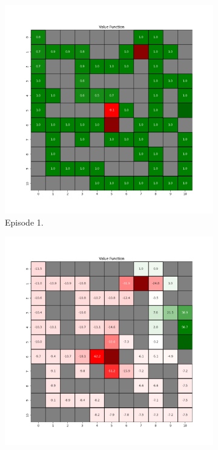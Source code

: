 \documentclass{assignment}
\begin{document}
\begin{figure}[H]
    \begin{subfigure}{0.3\textwidth}
        \includegraphics[width=\textwidth]{figures/value_td/epsilon_sweep/value_function_alpha_0.1_gamma_0.95_epsilon_0.5_iteration_1.png}
    \caption{Episode 1.}
    \end{subfigure}\hfill
    \begin{subfigure}{0.3\textwidth}
        \includegraphics[width=\textwidth]{figures/value_td/epsilon_sweep/value_function_alpha_0.1_gamma_0.95_epsilon_0.5_iteration_50.png}

\end{subfigure}
\end{figure}
\end{document}
